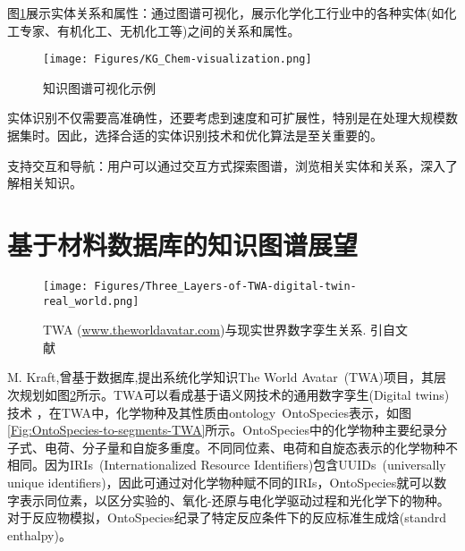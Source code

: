 图\ref{Fig:KG-Chem_visualization}展示实体关系和属性：通过图谱可视化，展示化学化工行业中的各种实体(如化工专家、有机化工、无机化工等)之间的关系和属性。
\begin{figure}[h!]
\centering
\texttt{[image: Figures/KG\_Chem-visualization.png]}
\caption{\small\textrm{知识图谱可视化示例}}%
\label{Fig:KG-Chem_visualization}
\end{figure}
实体识别不仅需要高准确性，还要考虑到速度和可扩展性，特别是在处理大规模数据集时。因此，选择合适的实体识别技术和优化算法是至关重要的。

支持交互和导航：用户可以通过交互方式探索图谱，浏览相关实体和关系，深入了解相关知识。

\section{基于材料数据库的知识图谱展望} 
\begin{figure}[h!]
\centering
\texttt{[image: Figures/Three\_Layers-of-TWA-digital-twin-real\_world.png]}
\caption{\small\textrm{TWA (\url{www.theworldavatar.com})与现实世界数字孪生关系. 引自文献~\cite{ACR56-128_2023}}}%
\label{Fig:Three_Layers-of-TWA}
\end{figure}
\textrm{M. Kraft,}曾基于数据库,提出系统化学知识\textrm{The World Avatar~(TWA)}项目，其层次规划如图\ref{Fig:Three_Layers-of-TWA}所示。\textrm{TWA}可以看成基于语义网技术的通用数字孪生\textrm{(Digital twins)}技术%
，在\textrm{TWA}中，化学物种及其性质由\textrm{ontology~OntoSpecies}表示，如图\ref{Fig:OntoSpecies-to-segments-TWA}所示。\textrm{OntoSpecies}中的化学物种主要纪录分子式、电荷、分子量和自旋多重度。不同同位素、电荷和自旋态表示的化学物种不相同。因为\textrm{IRIs~(Internationalized Resource Identifiers)}包含\textrm{UUIDs~(universally unique identifiers)}，因此可通过对化学物种赋不同的\textrm{IRIs}，\textrm{OntoSpecies}就可以数字表示同位素，以区分实验的、氧化-还原与电化学驱动过程和光化学下的物种。对于反应物模拟，\textrm{OntoSpecies}纪录了特定反应条件下的反应标准生成焓\textrm{(standrd enthalpy)}。
